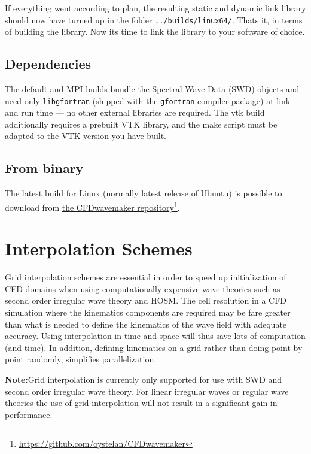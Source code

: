 \documentclass{ol-softwaremanual}
\newcommand{\doclink}[2]{\href{#1}{#2}\footnote{\url{#1}}}
\begin{document}
If everything went according to plan, the resulting static and dynamic link library should now have turned up in the folder \texttt{../builds/linux64/}. Thats it, in terms of building the library. Now its time to link the library to your software of choice.

\subsection{Dependencies}
The default and MPI builds bundle the Spectral-Wave-Data (SWD) objects and need only \texttt{libgfortran} (shipped with the \texttt{gfortran} compiler package) at link and run time --- no other external libraries are required. The vtk build additionally requires a prebuilt VTK library, and the make script must be adapted to the VTK version you have built.

\subsection{From binary}
The latest build for Linux (normally latest release of Ubuntu) is possible to download from \doclink{https://github.com/oystelan/CFDwavemaker}{the CFDwavemaker repository}.


\section{Interpolation Schemes}
Grid interpolation schemes are essential in order to speed up initialization of CFD domains when using computationally expensive wave theories such as second order irregular wave theory and HOSM. The cell resolution in a CFD simulation where the kinematics components are required may be fare greater than what is needed to define the kinematics of the wave field with adequate accuracy. Using interpolation in time and space will thus save lots of computation (and time). In addition, defining kinematics on a grid rather than doing point by point randomly, simplifies parallelization.

\textbf{Note:}Grid interpolation is currently only supported for use with SWD and second order irregular wave theory. For linear irregular waves or regular wave theories the use of grid interpolation will not result in a significant gain in performance.
\end{document}
